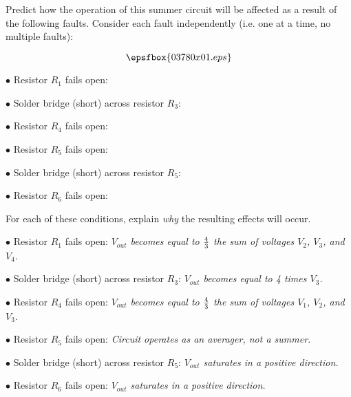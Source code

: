 

Predict how the operation of this summer circuit will be affected as a result of the following faults.  Consider each fault independently (i.e. one at a time, no multiple faults):

$$\epsfbox{03780x01.eps}$$

\medskip
\item{$\bullet$} Resistor $R_1$ fails open:
\vskip 5pt
\item{$\bullet$} Solder bridge (short) across resistor $R_3$:
\vskip 5pt
\item{$\bullet$} Resistor $R_4$ fails open:
\vskip 5pt
\item{$\bullet$} Resistor $R_5$ fails open:
\vskip 5pt
\item{$\bullet$} Solder bridge (short) across resistor $R_5$:
\vskip 5pt
\item{$\bullet$} Resistor $R_6$ fails open:
\medskip

For each of these conditions, explain {\it why} the resulting effects will occur.







\medskip
\item{$\bullet$} Resistor $R_1$ fails open: {\it $V_{out}$ becomes equal to ${4 \over 3}$ the sum of voltages $V_2$, $V_3$, and $V_4$.}
\vskip 5pt
\item{$\bullet$} Solder bridge (short) across resistor $R_3$: {\it $V_{out}$ becomes equal to 4 times $V_3$.}
\vskip 5pt
\item{$\bullet$} Resistor $R_4$ fails open: {\it $V_{out}$ becomes equal to ${4 \over 3}$ the sum of voltages $V_1$, $V_2$, and $V_3$.}
\vskip 5pt
\item{$\bullet$} Resistor $R_5$ fails open: {\it Circuit operates as an averager, not a summer.}
\vskip 5pt
\item{$\bullet$} Solder bridge (short) across resistor $R_5$: {\it $V_{out}$ saturates in a positive direction.}
\vskip 5pt
\item{$\bullet$} Resistor $R_6$ fails open: {\it $V_{out}$ saturates in a positive direction.}
\medskip






